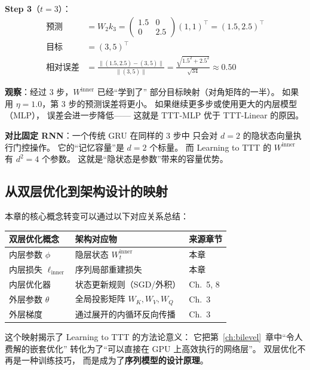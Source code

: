 \begin{example}
\textbf{Step 3}（$t=3$）：
\begin{align}
  \text{预测} &= W_2 k_3 = \begin{pmatrix} 1.5 & 0 \\ 0 & 2.5 \end{pmatrix}
  (1,1)^\top = (1.5, 2.5)^\top \\
  \text{目标} &= (3, 5)^\top \\
  \text{相对误差} &= \frac{\|(1.5, 2.5) - (3, 5)\|}{\|(3, 5)\|}
  = \frac{\sqrt{1.5^2 + 2.5^2}}{\sqrt{34}} \approx 0.50
\end{align}

\textbf{观察}：经过 3 步，$W^{\text{inner}}$ 已经``学到了''
部分目标映射（对角矩阵的一半）。
如果用 $\eta = 1.0$，第 3 步的预测误差将更小。
如果继续更多步或使用更大的内层模型（MLP），
误差会进一步降低——
这就是 TTT-MLP 优于 TTT-Linear 的原因。

\textbf{对比固定 RNN}：一个传统 GRU 在同样的 3 步中
只会对 $d=2$ 的隐状态向量执行门控操作。
它的``记忆容量''是 $d = 2$ 个标量。
而 Learning to TTT 的 $W^{\text{inner}}$ 有 $d^2 = 4$ 个参数。
这就是``隐状态是参数''带来的容量优势。
\end{example}

\subsection*{从双层优化到架构设计的映射}

本章的核心概念转变可以通过以下对应关系总结：

\begin{center}
\begin{tabular}{p{4.5cm} p{4.5cm} p{3.5cm}}
\toprule
\textbf{双层优化概念} & \textbf{架构对应物} & \textbf{来源章节} \\
\midrule
内层参数 $\phi$ & 隐层状态 $W^{\text{inner}}_t$ & 本章 \\
内层损失 $\ell_{\text{inner}}$ & 序列局部重建损失 & 本章 \\
内层优化器 & 状态更新规则（SGD/外积） & Ch.~5, 8 \\
外层参数 $\theta$ & 全局投影矩阵 $W_K, W_V, W_Q$ & Ch.~3 \\
外层梯度 & 通过展开的内循环反向传播 & Ch.~3 \\
\bottomrule
\end{tabular}
\end{center}

这个映射揭示了 Learning to TTT 的方法论意义：
它把第~\ref{ch:bilevel}~章中``令人费解的嵌套优化''
转化为了``可以直接在 GPU 上高效执行的网络层''。
双层优化不再是一种训练技巧，
而是成为了\textbf{序列模型的设计原理}。

